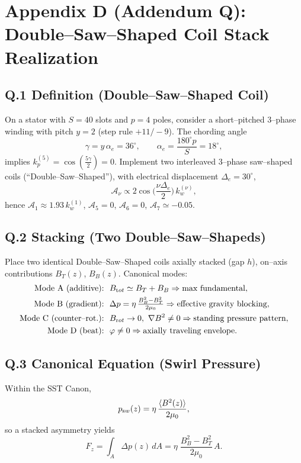 \documentclass[12pt]{article}
\begin{document}
\section*{Appendix D (Addendum Q): Double--Saw--Shaped Coil Stack Realization}
\label{sec:addendumQ}
\subsection*{Q.1 Definition (Double--Saw--Shaped Coil)}
    On a stator with $S=40$ slots and $p=4$ poles, consider a short--pitched 3--phase winding with pitch $y=2$ (step rule $+11/ -9$). The chording angle
    \[
        \gamma = y\,\alpha_e = 36^\circ,\qquad
        \alpha_e = \frac{180^\circ p}{S} = 18^\circ,
    \]
    implies $k_p^{(5)}=\cos(\tfrac{5\gamma}{2})=0$. Implement two interleaved 3--phase saw--shaped coils (``Double--Saw--Shaped''), with electrical displacement $\Delta_e=30^\circ$,
    \[
        \mathcal A_\nu \propto 2\cos\!\Big(\frac{\nu\Delta_e}{2}\Big)\,k_w^{(\nu)}\!,
    \]
    hence $\mathcal A_1 \approx 1.93\,k_w^{(1)}$, $\mathcal A_5=0$, $\mathcal A_6=0$, $\mathcal A_7\simeq -0.05$.

\subsection*{Q.2 Stacking (Two Double--Saw--Shapeds)}
    Place two identical Double--Saw--Shaped coils axially stacked (gap $h$), on--axis contributions $B_T(z)$, $B_B(z)$. Canonical modes:
    \begin{align*}
    \text{Mode A (additive):}&\ \ B_{\textrm tot}\simeq B_T+B_B \Rightarrow \text{max fundamental},\\
    \text{Mode B (gradient):}&\ \ \Delta p = \eta\,\tfrac{B_B^2-B_T^2}{2\mu_0} \Rightarrow \text{effective gravity blocking},\\
    \text{Mode C (counter--rot.):}&\ \ B_{\textrm rot}\to 0,\ \nabla B^2\neq 0 \Rightarrow \text{standing pressure pattern},\\
    \text{Mode D (beat):}&\ \ \varphi\neq 0 \Rightarrow \text{axially traveling envelope}.
    \end{align*}

\subsection*{Q.3 Canonical Equation (Swirl Pressure)}
    Within the SST Canon,
    \[
        p_{\textrm sw}(z) = \eta\,\frac{\langle B^2(z)\rangle}{2\mu_0},
    \]
    so a stacked asymmetry yields
    \[
        F_z = \int_A \Delta p(z)\,dA
        =\eta\;\frac{B_B^2-B_T^2}{2\mu_0}\,A.
    \]
\end{document}
